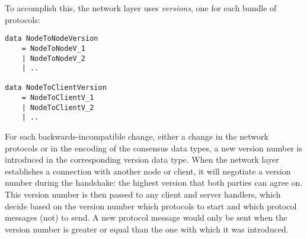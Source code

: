To accomplish this, the network layer uses \emph{versions}, one for each bundle
of protocols:
\begin{lstlisting}
data NodeToNodeVersion
    = NodeToNodeV_1
    | NodeToNodeV_2
    | ..

data NodeToClientVersion
    = NodeToClientV_1
    | NodeToClientV_2
    | ..
\end{lstlisting}
For each backwards-incompatible change, either a change in the network protocols
or in the encoding of the consensus data types, a new version number is
introduced in the corresponding version data type. When the network layer
establishes a connection with another node or client, it will negotiate a
version number during the handshake: the highest version that both parties can
agree on. This version number is then passed to any client and server handlers,
which decide based on the version number which protocols to start and which
protocol messages (not) to send. A new protocol message would only be sent when
the version number is greater or equal than the one with which it was
introduced.

